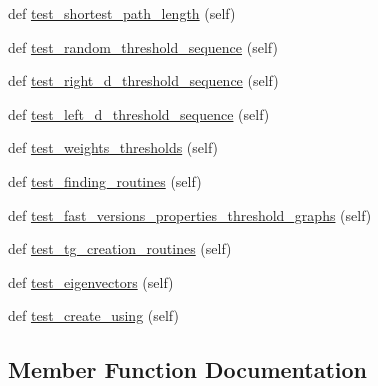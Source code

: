 \begin{DoxyCompactItemize}
\item 
def \hyperlink{classnetworkx_1_1algorithms_1_1tests_1_1test__threshold_1_1TestGeneratorThreshold_a594c93f2c62c90c13883e13a5ff1a24d}{test\+\_\+shortest\+\_\+path\+\_\+length} (self)
\item 
def \hyperlink{classnetworkx_1_1algorithms_1_1tests_1_1test__threshold_1_1TestGeneratorThreshold_ad640284714c7cda8d642fff323fa7a6f}{test\+\_\+random\+\_\+threshold\+\_\+sequence} (self)
\item 
def \hyperlink{classnetworkx_1_1algorithms_1_1tests_1_1test__threshold_1_1TestGeneratorThreshold_a5ca69c361ae8374ebc02755c7945f3e8}{test\+\_\+right\+\_\+d\+\_\+threshold\+\_\+sequence} (self)
\item 
def \hyperlink{classnetworkx_1_1algorithms_1_1tests_1_1test__threshold_1_1TestGeneratorThreshold_a8f62a08b11eb3d18e53333c880867c99}{test\+\_\+left\+\_\+d\+\_\+threshold\+\_\+sequence} (self)
\item 
def \hyperlink{classnetworkx_1_1algorithms_1_1tests_1_1test__threshold_1_1TestGeneratorThreshold_a80e3c23784d77fd3a6b24ff374b0c7f7}{test\+\_\+weights\+\_\+thresholds} (self)
\item 
def \hyperlink{classnetworkx_1_1algorithms_1_1tests_1_1test__threshold_1_1TestGeneratorThreshold_aad307df19a4d84720ad5eea11807e9d1}{test\+\_\+finding\+\_\+routines} (self)
\item 
def \hyperlink{classnetworkx_1_1algorithms_1_1tests_1_1test__threshold_1_1TestGeneratorThreshold_a280046db6041a4a663e8751eadf7e48f}{test\+\_\+fast\+\_\+versions\+\_\+properties\+\_\+threshold\+\_\+graphs} (self)
\item 
def \hyperlink{classnetworkx_1_1algorithms_1_1tests_1_1test__threshold_1_1TestGeneratorThreshold_a783898fce2c5903a431569517cb360af}{test\+\_\+tg\+\_\+creation\+\_\+routines} (self)
\item 
def \hyperlink{classnetworkx_1_1algorithms_1_1tests_1_1test__threshold_1_1TestGeneratorThreshold_af69b049d29ca0b05df85f998f7d79149}{test\+\_\+eigenvectors} (self)
\item 
def \hyperlink{classnetworkx_1_1algorithms_1_1tests_1_1test__threshold_1_1TestGeneratorThreshold_a7c00a46d9e4fc9fcb2654ed2f4fa9b4f}{test\+\_\+create\+\_\+using} (self)
\end{DoxyCompactItemize}


\subsection{Member Function Documentation}
\mbox{\label{classnetworkx_1_1algorithms_1_1tests_1_1test__threshold_1_1TestGeneratorThreshold_a7c00a46d9e4fc9fcb2654ed2f4fa9b4f}} 
